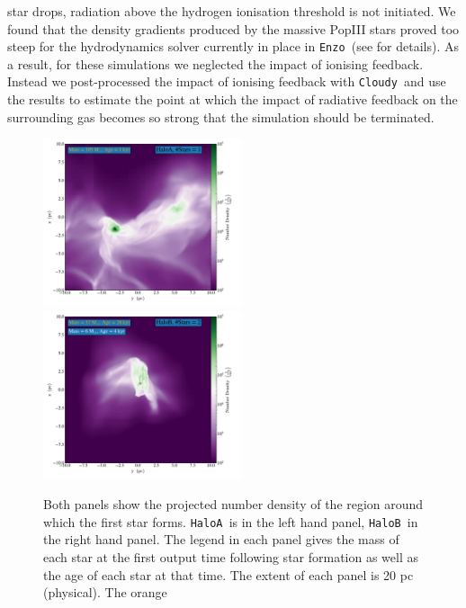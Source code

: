 \documentclass[graphics, twocolumn, usenatbib]{mn2e}
\newcommand{\enzo}{\texttt{Enzo~}}
\newcommand{\cloudy}{\texttt{Cloudy~}}
\newcommand{\ha} {\texttt{HaloA~}}
\newcommand{\hb} {\texttt{HaloB~}}
\begin{document}
star drops, radiation above the hydrogen ionisation threshold is not initiated. We found that the
density gradients produced by the massive PopIII stars proved too steep for the hydrodynamics solver
currently in place in \enzo (see \cite{Enzo_2014} for details). As a result, for these simulations
we neglected the impact of ionising feedback. Instead we post-processed the impact of
ionising feedback with \cloudy and use the results to estimate the point at which the impact of
radiative feedback on the surrounding gas becomes so strong that the simulation should be terminated.
\begin{figure} 
\centering
\begin{minipage}{175mm}      \begin{center} 
\centerline{
\includegraphics[width=0.52\textwidth]{FIGURES/HaloA/Proj_z_number_density_0001.pdf}
\includegraphics[width=0.52\textwidth]{FIGURES/HaloB/Proj_z_number_density_0028.pdf}}
\caption{Both panels show the projected number density of the region around which the first
  star forms. \ha is in the left hand panel, \hb in the right hand panel.
  The legend in each panel gives the mass of each star at the first output time following star
  formation as well as the age of each star at that time. The extent of each panel is 20 pc (physical). The orange
}
\end{center}
\end{minipage}
\end{figure}
\end{document}
